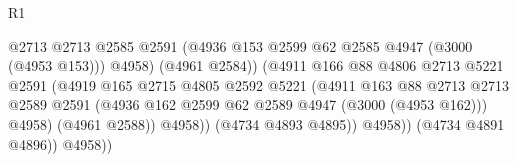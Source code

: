 \begin{lexlean}{R1}
\begin{coremodule}
                                                @2713
                                                @2713
                                                @2585
                                                @2591
                                                (@4936
                                                  @153
                                                  @2599
                                                  @62
                                                  @2585
                                                  @4947
                                                  (@3000 (@4953 @153)))
                                                @4958)
                                              (@4961 @2584))
                                            (@4911
                                              @166
                                              @88
                                              @4806
                                              @2713
                                              @5221
                                              @2591
                                              (@4919
                                                @165
                                                @2715
                                                @4805
                                                @2592
                                                @5221
                                                (@4911
                                                  @163
                                                  @88
                                                  @2713
                                                  @2713
                                                  @2589
                                                  @2591
                                                  (@4936
                                                    @162
                                                    @2599
                                                    @62
                                                    @2589
                                                    @4947
                                                    (@3000 (@4953 @162)))
                                                  @4958)
                                                (@4961 @2588))
                                              @4958))
                                          (@4734 @4893 @4895))
                                        @4958))
                                    (@4734 @4891 @4896))
                                  @4958))

\end{coremodule}
\end{lexlean}
